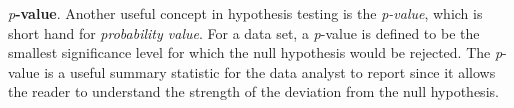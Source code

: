 
\textit{p}\textbf{-value}. Another useful concept in hypothesis
testing is the \emph{p-value}, which is short hand for
\emph{probability value}. For a data set, a \textit{p}-value is
defined to be the smallest significance level for which the null
hypothesis would be rejected. The \textit{p}-value is a useful
summary statistic for the data analyst to report since it allows the
reader to understand the strength of the deviation from the null
hypothesis.
